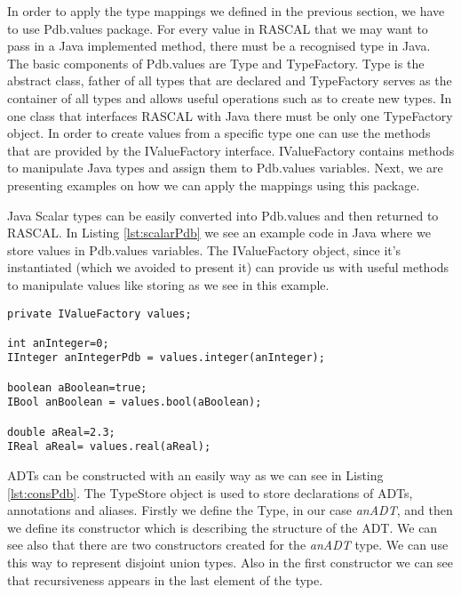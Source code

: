 In order to apply the type mappings we defined in the previous section, we have to use Pdb.values package. For every value in RASCAL that we may want to pass in a  Java implemented method, there must be a recognised type in Java. The basic components of Pdb.values are Type and TypeFactory. Type is the abstract class, father of all types that are declared and TypeFactory serves as the container of all types and allows useful operations such as to create new types. In one class that interfaces RASCAL with Java there must be only one TypeFactory object\cite{pdbdoc}. In order to create values from a specific type one can use the methods that are provided by the IValueFactory interface. IValueFactory contains methods to manipulate Java types and assign them to Pdb.values variables. Next, we are presenting examples on how we can apply the mappings using this package.

Java Scalar types can be easily converted into Pdb.values and then returned to RASCAL. In Listing \ref{lst:scalarPdb} we see an example code in Java where we store values in Pdb.values variables. The IValueFactory object, since it's instantiated (which we avoided to present it) can provide us with useful methods to manipulate values like storing as we see in this example.

\begin{lstlisting}[label=lst:scalarPdb,caption=Assignment of Java scalar values to Pdb.values variables.]
private IValueFactory values;

int anInteger=0;
IInteger anIntegerPdb = values.integer(anInteger);

boolean aBoolean=true;
IBool anBoolean = values.bool(aBoolean);

double aReal=2.3;
IReal aReal= values.real(aReal);
\end{lstlisting}


ADTs can be constructed with an easily way as we can see in Listing \ref{lst:consPdb}. The TypeStore object is used to store declarations of ADTs, annotations and aliases. Firstly we define the Type, in our case \textsl{anADT}, and then we define its constructor which is describing the structure of the ADT. We can see also that there are two constructors created for the \textsl{anADT} type. We can use this way to represent disjoint union types. Also in the first constructor we can see that recursiveness appears in the last element of the type.

